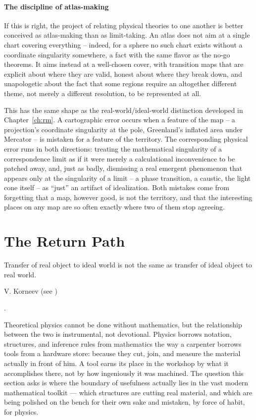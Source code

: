 \paragraph{The discipline of atlas-making}

If this is right, the project of relating physical theories to one another is
better conceived as atlas-making than as limit-taking. An atlas does not aim at
a single chart covering everything -- indeed, for a sphere no such chart exists
without a coordinate singularity somewhere, a fact with the same flavor as the
no-go theorems. It aims instead at a well-chosen cover, with transition maps
that are explicit about where they are valid, honest about where they break
down, and unapologetic about the fact that some regions require an altogether
different theme, not merely a different resolution, to be represented at all.

This has the same shape as the real-world/ideal-world distinction developed in
Chapter~\ref{ch:rm}. A cartographic error occurs when a feature of the map -- a
projection's coordinate singularity at the pole, Greenland's inflated area
under Mercator -- is mistaken for a feature of the territory. The corresponding
physical error runs in both directions: treating the mathematical singularity
of a correspondence limit as if it were merely a calculational inconvenience to
be patched away, and, just as badly, dismissing a real emergent phenomenon that
appears only at the singularity of a limit -- a phase transition, a caustic,
the light cone itself -- as ``just'' an artifact of idealization. Both mistakes
come from forgetting that a map, however good, is not the territory, and that
the interesting places on any map are so often exactly where two of them stop
agreeing.

\section{The Return Path}
\label{sec:rm-rp}
\epigraph{Transfer of real object to ideal world
is not the same as transfer of ideal object to real world.}
{ V. Korneev (see \cite{StrugatskyStrugatsky2017})}.

Theoretical physics cannot be done without mathematics, but the relationship
between the two is instrumental, not devotional. Physics borrows notation,
structures, and inference rules from mathematics the way a carpenter borrows
tools from a hardware store: because they cut, join, and measure the material
actually in front of him. A tool earns its place in the workshop by what it
accomplishes there, not by how ingeniously it was machined. The question this
section asks is where the boundary of usefulness actually lies in the vast
modern mathematical toolkit --- which structures are cutting real material, and
which are being polished on the bench for their own sake and mistaken, by force
of habit, for physics.


